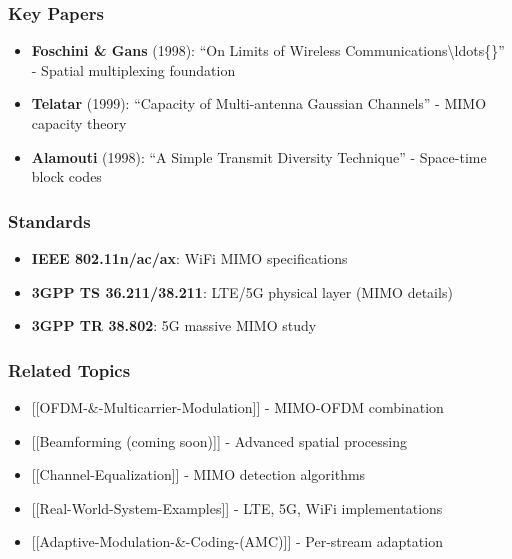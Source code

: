 \subsubsection{Key Papers}\label{key-papers}

\begin{itemize}
\tightlist
\item
  \textbf{Foschini \& Gans} (1998): ``On Limits of Wireless
  Communications\textbackslash ldots\{\}'' - Spatial multiplexing
  foundation
\item
  \textbf{Telatar} (1999): ``Capacity of Multi-antenna Gaussian
  Channels'' - MIMO capacity theory
\item
  \textbf{Alamouti} (1998): ``A Simple Transmit Diversity Technique'' -
  Space-time block codes
\end{itemize}

\subsubsection{Standards}\label{standards}

\begin{itemize}
\tightlist
\item
  \textbf{IEEE 802.11n/ac/ax}: WiFi MIMO specifications
\item
  \textbf{3GPP TS 36.211/38.211}: LTE/5G physical layer (MIMO details)
\item
  \textbf{3GPP TR 38.802}: 5G massive MIMO study
\end{itemize}

\subsubsection{Related Topics}\label{related-topics}

\begin{itemize}
\tightlist
\item
  {[}{[}OFDM-\&-Multicarrier-Modulation{]}{]} - MIMO-OFDM combination
\item
  {[}{[}Beamforming (coming soon){]}{]} - Advanced spatial processing
\item
  {[}{[}Channel-Equalization{]}{]} - MIMO detection algorithms
\item
  {[}{[}Real-World-System-Examples{]}{]} - LTE, 5G, WiFi implementations
\item
  {[}{[}Adaptive-Modulation-\&-Coding-(AMC){]}{]} - Per-stream
  adaptation
\end{itemize}

